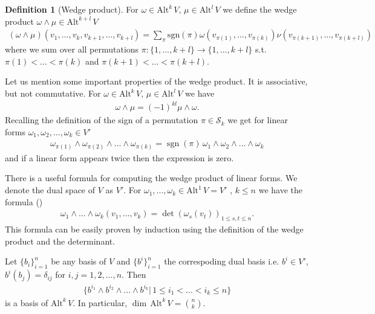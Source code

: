 \documentclass[12pt,a4paper]{article}
\numberwithin{equation}{subsection}
\numberwithin{lemma}{subsection}
\theoremstyle{definition}
\newtheorem{definition}[lemma]{Definition}
\DeclareMathOperator{\sgn}{sgn}
\newcommand{\alternating}[2]{ {\text{Alt}^{#1}\,#2} }
\begin{document}
\begin{definition}[Wedge product]
    For $\omega \in 
    \alternating{k}{V}$, $\mu \in 
    \alternating{l}{V}$ we define the wedge product $\omega \wedge \mu \in 
    \alternating{k+l}{V}$ 
    \begin{align*}
        (\omega \wedge \mu) (v_1,...,v_k,v_{k+1},...,v_{k+l}) =
        \sum\limits_\pi
        \text{sgn}(\pi) \omega(v_{\pi(1)},...,v_{\pi(k)}) 
        \nu(v_{\pi(k+1)},...,v_{\pi(k+l)})
    \end{align*}
    where we sum over all permutations 
    $\pi: \{1,...,k+l\} \rightarrow \{1,...,k+l\}$ 
    s.t. $\pi(1) < ... < \pi(k)$ and $\pi(k+1) < ... < \pi(k+l)$.        
\end{definition}

Let us mention some important properties of the wedge product. It is 
associative, but not commutative. For $\omega \in 
\alternating{k}{V}$, $\mu \in 
\alternating{l}{V}$ we have 
\begin{align}
    \omega \wedge \mu = (-1)^{kl} \mu \wedge \omega. \label{eq:commutativity_wedge_product}
\end{align}
Recalling the definition of the sign of a permutation $\pi \in \mathcal{S}_k$ 
we get for linear forms $\omega_1, \omega_2, ..., \omega_k \in V'$
\begin{align*}
    \omega_{\pi(1)} \wedge \omega_{\pi(2)} \wedge ... \wedge \omega_{\pi(k)}
    = \sgn(\pi) \, \omega_1 \wedge \omega_2 \wedge ... \wedge \omega_k
\end{align*}
and if a linear form appears twice then the expression is zero.

There is a useful formula for computing the wedge product of linear forms.
We denote the dual space of $V$ as $V'$.
For  $\omega_1,...,\omega_k \in \alternating{1}{V} = V'$
, $k \leq n$ we have the formula (\cite[p.260]{topology_and_geometry})
\begin{align}
    \omega_1 \wedge ... \wedge \omega_k (v_1,...,v_k)
    = \det (\omega_s(v_t))_{1\leq s,t \leq n}. 
    \label{eq:wedge_product_of_one_forms}
\end{align}
This formula can be easily proven by induction using the definition of the 
wedge product and the determinant.

Let $\{ b_i\}_{i=1}^n$ be any basis of $V$ and $\{ b^i\}_{i=1}^n$ the 
correspoding dual basis i.e. 
$b^i \in V'$, $b^i(b_j) = \delta_{ij}$ for $i,j = 1,2,..., n$. Then 
\begin{align*}
    \{b^{i_1} \wedge b^{i_2} \wedge ... \wedge b^{i_k} | \, 
    1 \leq i_1 < ... < i_k \leq n \}
\end{align*}
is a basis of $\alternating{k}{V}$. In particular, 
$\dim\, \alternating{k}{V} = \binom{n}{k}$.
\end{document}
